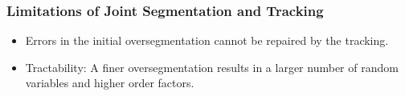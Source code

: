 


\begin{frame}
    \frametitle{Limitations of Joint Segmentation and Tracking}
    \begin{itemize}
          \item<1-> Errors in the initial oversegmentation cannot be repaired by the tracking.
          \item<2-> Tractability: A finer oversegmentation results in a larger number of random variables
        and higher order factors.
    \end{itemize}
\end{frame}



